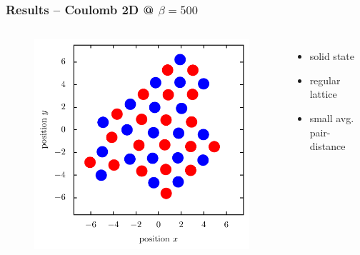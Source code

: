 \documentclass[mathserif,serif]{beamer}
\begin{document}
\begin{frame}
	\frametitle{Results -- Coulomb 2D @ $\beta=500$}
	\centering
	\begin{columns}	
	\begin{figure}
	\includegraphics[width=\textwidth]{../report/figures/Kristall_3_beta_500.pdf}
	\end{figure}
	\begin{itemize}
	\setlength{\itemsep}{1.5em}
	\item solid state
	\item regular lattice
	\item small avg. pair-distance	
	\end{itemize}
\end{columns}
\end{frame}
\end{document}
